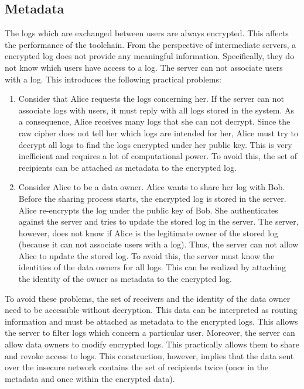 \documentclass[../main.tex]{subfiles}
\begin{document}
\subsection{Metadata}
\label{sec:metadata}
The logs which are exchanged between users are always encrypted.
This affects the performance of the toolchain.
From the perspective of intermediate servers, a encrypted log does not provide any meaningful information.
Specifically, they do not know which users have access to a log.
The server can not associate users with a log.
This introduces the following practical problems:
\begin{enumerate}
    \item 
    Consider that Alice requests the logs concerning her.
    If the server can not associate logs with users, it must reply with all logs stored in the system.
    As a consequence, Alice receives many logs that she can not decrypt.
    Since the raw cipher does not tell her which logs are intended for her, Alice must try to decrypt all logs to find the logs encrypted under her public key.
    This is very inefficient and requires a lot of computational power.
    To avoid this, the set of recipients can be attached as metadata to the encrypted log.
    \item 
    Consider Alice to be a data owner.
    Alice wants to share her log with Bob.
    Before the sharing process starts, the encrypted log is stored in the server.
    Alice re-encrypts the log under the public key of Bob.
    She authenticates against the server and tries to update the stored log in the server.
    The server, however, does not know if Alice is the legitimate owner of the stored log (because it can not associate users with a log).
    Thus, the server can not allow Alice to update the stored log.
    To avoid this, the server must know the identities of the data owners for all logs.
    This can be realized by attaching the identity of the owner as metadata to the encrypted log.
\end{enumerate}
To avoid these problems, the set of receivers and the identity of the data owner need to be accessible without decryption.
This data can be interpreted as routing information and must be attached as metadata to the encrypted logs.
This allows the server to filter logs which concern a particular user.
Moreover, the server can allow data owners to modify encrypted logs.
This practically allows them to share and revoke access to logs.
This construction, however, implies that the data sent over the insecure network contains the set of recipients twice (once in the metadata and once within the encrypted data).
\end{document}
